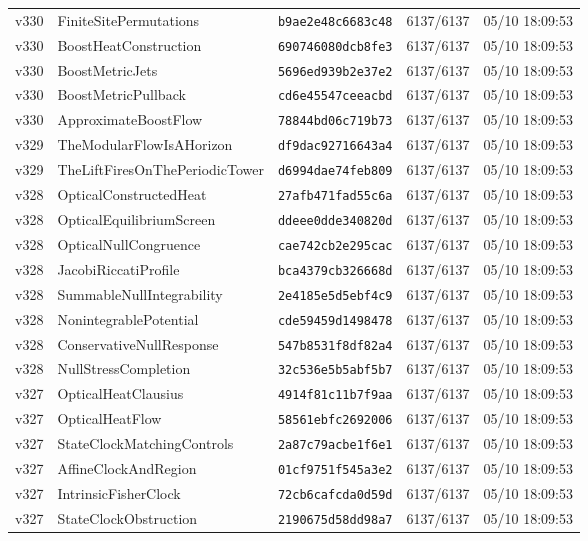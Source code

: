 \documentclass[11pt]{article}
\theoremstyle{definition}\newtheorem{deriv}{Derivação}
\begin{document}
{\begin{longtable}{@{}lllll@{}}
v330 & FiniteSitePermutations & \texttt{b9ae2e48c6683c48} & 6137/6137 & 05/10 18:09:53 \\
v330 & BoostHeatConstruction & \texttt{690746080dcb8fe3} & 6137/6137 & 05/10 18:09:53 \\
v330 & BoostMetricJets & \texttt{5696ed939b2e37e2} & 6137/6137 & 05/10 18:09:53 \\
v330 & BoostMetricPullback & \texttt{cd6e45547ceeacbd} & 6137/6137 & 05/10 18:09:53 \\
v330 & ApproximateBoostFlow & \texttt{78844bd06c719b73} & 6137/6137 & 05/10 18:09:53 \\
v329 & TheModularFlowIsAHorizon & \texttt{df9dac92716643a4} & 6137/6137 & 05/10 18:09:53 \\
v329 & TheLiftFiresOnThePeriodicTower & \texttt{d6994dae74feb809} & 6137/6137 & 05/10 18:09:53 \\
v328 & OpticalConstructedHeat & \texttt{27afb471fad55c6a} & 6137/6137 & 05/10 18:09:53 \\
v328 & OpticalEquilibriumScreen & \texttt{ddeee0dde340820d} & 6137/6137 & 05/10 18:09:53 \\
v328 & OpticalNullCongruence & \texttt{cae742cb2e295cac} & 6137/6137 & 05/10 18:09:53 \\
v328 & JacobiRiccatiProfile & \texttt{bca4379cb326668d} & 6137/6137 & 05/10 18:09:53 \\
v328 & SummableNullIntegrability & \texttt{2e4185e5d5ebf4c9} & 6137/6137 & 05/10 18:09:53 \\
v328 & NonintegrablePotential & \texttt{cde59459d1498478} & 6137/6137 & 05/10 18:09:53 \\
v328 & ConservativeNullResponse & \texttt{547b8531f8df82a4} & 6137/6137 & 05/10 18:09:53 \\
v328 & NullStressCompletion & \texttt{32c536e5b5abf5b7} & 6137/6137 & 05/10 18:09:53 \\
v327 & OpticalHeatClausius & \texttt{4914f81c11b7f9aa} & 6137/6137 & 05/10 18:09:53 \\
v327 & OpticalHeatFlow & \texttt{58561ebfc2692006} & 6137/6137 & 05/10 18:09:53 \\
v327 & StateClockMatchingControls & \texttt{2a87c79acbe1f6e1} & 6137/6137 & 05/10 18:09:53 \\
v327 & AffineClockAndRegion & \texttt{01cf9751f545a3e2} & 6137/6137 & 05/10 18:09:53 \\
v327 & IntrinsicFisherClock & \texttt{72cb6cafcda0d59d} & 6137/6137 & 05/10 18:09:53 \\
v327 & StateClockObstruction & \texttt{2190675d58dd98a7} & 6137/6137 & 05/10 18:09:53 \\

\end{longtable}}
\end{document}
